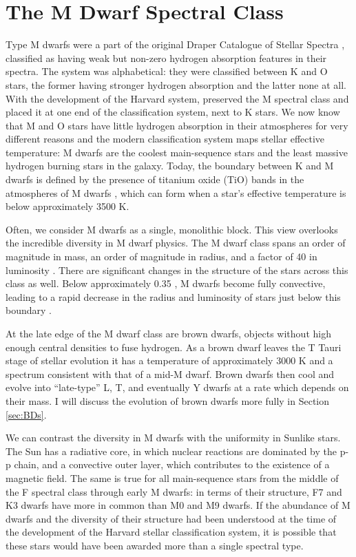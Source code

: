 \section{The M Dwarf Spectral Class}
Type M dwarfs were a part of the original Draper Catalogue of Stellar Spectra \citep{Pickering90}, 
classified as having weak but non-zero hydrogen absorption features in their spectra.
The system was alphabetical: they were classified between K and O stars, 
the former having stronger hydrogen absorption and the latter none at all.
With the development of the Harvard system, \citet{Cannon01} preserved the M spectral class and placed it
at one end of the classification system, next to K stars.
We now know that M and O stars have little hydrogen absorption in their atmospheres for very different reasons
and the modern classification system maps stellar effective temperature: M dwarfs are the coolest main-sequence
stars and the least massive hydrogen burning stars in the galaxy.
Today, the boundary between K and M dwarfs is defined by the presence of titanium oxide (TiO) bands in the
atmospheres of M dwarfs \citep{Kuiper38, Morgan38}, which can form when a star's effective temperature is below approximately 3500 K.

Often, we consider M dwarfs as a single, monolithic block.
This view overlooks the incredible diversity in M dwarf physics.
The M dwarf class spans an order of magnitude in mass, 
an order of magnitude in radius, and
a factor of 40 in luminosity \citep{Veeder74}.
There are significant changes in the structure of the stars across this class as well.
Below approximately 0.35 \msun, M dwarfs become fully convective, leading to a
rapid decrease in the radius and luminosity of stars just below this boundary \citep{Chabrier97}.

At the late edge of the M dwarf class are brown dwarfs, objects without high enough central densities to 
fuse hydrogen. 
As a brown dwarf leaves the T Tauri stage of stellar evolution it has a temperature of approximately 3000 K
and a spectrum consistent with that of a mid-M dwarf.
Brown dwarfs then cool and evolve into ``late-type'' L, T, and eventually Y dwarfs at a rate 
which depends on their mass.
I will discuss the evolution of brown dwarfs more fully in Section \ref{sec:BDs}.




We can contrast the diversity in M dwarfs with the uniformity in Sunlike stars. 
The Sun has a radiative core, in which nuclear reactions are dominated by the p-p chain, and a convective 
outer layer, which contributes to the existence of a magnetic field.
The same is true for all main-sequence stars from the middle of the F spectral class through early M dwarfs: 
in terms of their structure, F7 and K3 
dwarfs have more in common than M0 and M9 dwarfs.
If the abundance of M dwarfs and the diversity of their structure had been understood at the time of the development 
of the Harvard stellar classification system, it is possible that these stars would have been awarded more than a 
single spectral type.


